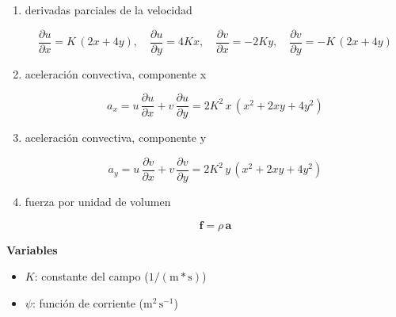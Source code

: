 \documentclass[10pt,openany]{book}
\begin{document}
\begin{tcolorbox}[title={Desarrollos del modelo}, studiumdef, breakable]
\begin{enumerate}
\[
\frac{\partial u}{\partial x} + \frac{\partial v}{\partial y} = K\,(2x + 4y) - K\,(2x + 4y) = 0
\]
\item
derivadas parciales de la velocidad

\[
\frac{\partial u}{\partial x} = K\,(2x + 4y),\quad \frac{\partial u}{\partial y} = 4Kx,\quad \frac{\partial v}{\partial x} = -2Ky,\quad \frac{\partial v}{\partial y} = -K\,(2x + 4y)
\]
\item
aceleración convectiva, componente x

\[
a_x = u\,\frac{\partial u}{\partial x} + v\,\frac{\partial u}{\partial y} = 2K^{2}\,x\,(x^{2} + 2xy + 4y^{2})
\]
\item
aceleración convectiva, componente y

\[
a_y = u\,\frac{\partial v}{\partial x} + v\,\frac{\partial v}{\partial y} = 2K^{2}\,y\,(x^{2} + 2xy + 4y^{2})
\]
\item
fuerza por unidad de volumen

\[
\mathbf{f} = \rho\,\mathbf{a}
\]
\end{enumerate}

\noindent\textbf{Variables}
\begin{itemize}
\item $K$: constante del campo ($\mathrm{1/(m*s)}$)
\item $\psi$: función de corriente ($\mathrm{m}^{2}\,\mathrm{s}^{-1}$)
\end{itemize}


\end{tcolorbox}
\end{document}
